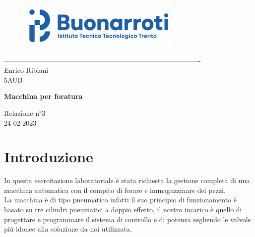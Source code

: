 \documentclass[12pt]{article}
\begin{document}
\begin{titlepage}
	\begin{center}
		\begin{figure}
			\centering
			\includegraphics[scale=1.2]{logo.png}
			\label{fig:logo}
		\end{figure}
		-------------------------------------------------------------------------------------\\
		\vspace{2\baselineskip}
		\large Enrico Ribiani\\
		\large 5AUB\\
		\vfill

		\Huge{\textbf{Macchina per foratura}}\\
		\vfill

		\LARGE{Relazione n°3}\\
		\vfill
		\large{24-02-2023}
	\end{center}
\end{titlepage}
\thispagestyle{empty}
\tableofcontents

\newpage
\setcounter{page}{1}
\section{Introduzione}
In questa esercitazione laboratoriale è stata richiesta la gestione completa di una macchina automatica con il compito di forare e immagazzinare dei pezzi.\\
La macchina è di tipo pneumatico infatti il suo principio di funzionamento è basato su tre cilindri pneumatici a doppio effetto, il nostro incarico è quello di progettare e programmare il sistema di controllo e di potenza segliendo le valvole più idonee alla soluzione da noi utilizzata.
\end{document}
